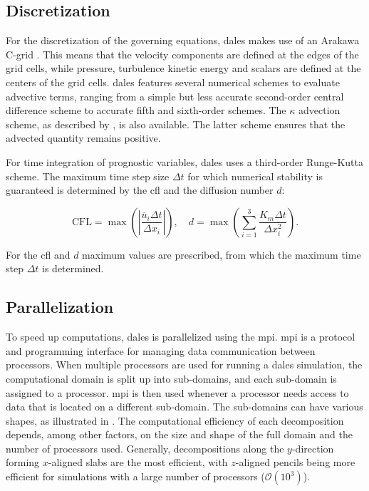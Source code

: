 \subsection{Discretization}
For the discretization of the governing equations, \acrshort{dales} makes use of an Arakawa C-grid \citep{arakawaComputationalDesignBasic1977}. This means that the velocity components are defined at the edges of the grid cells, while pressure, turbulence kinetic energy and scalars are defined at the centers of the grid cells. \acrshort{dales} features several numerical schemes to evaluate advective terms, ranging from a simple but less accurate second-order central difference scheme to accurate fifth and sixth-order schemes. The $\kappa$ advection scheme, as described by \citet{hundsdorferPositiveFiniteDifferenceAdvection1995}, is also available. The latter scheme ensures that the advected quantity remains positive.

For time integration of prognostic variables, \acrshort{dales} uses a third-order Runge-Kutta scheme. The maximum time step size $\Delta t$ for which numerical stability is guaranteed is determined by the \acrfull{cfl} and the diffusion number $d$:

\begin{equation}
    \text{CFL} = \max \left( \left| \frac{\overline{u}_i \Delta t}{\Delta x_i} \right| \right), \quad d = \max \left( \sum_{i=1}^{3} \frac{K_m \Delta t}{\Delta x_i^2} \right).
\end{equation}

For the \acrshort{cfl} and $d$ maximum values are prescribed, from which the maximum time step $\Delta t$ is determined.

\subsection{Parallelization} \label{sec:dales_mpi}
To speed up computations, \acrshort{dales} is parallelized using the \acrfull{mpi}. \acrshort{mpi} is a protocol and programming interface for managing data communication between processors. When multiple processors are used for running a \acrshort{dales} simulation, the computational domain is split up into sub-domains, and each sub-domain is assigned to a processor. \acrshort{mpi} is then used whenever a processor needs access to data that is located on a different sub-domain. The sub-domains can have various shapes, as illustrated in . The computational efficiency of each decomposition depends, among other factors, on the size and shape of the full domain and the number of processors used. Generally, decompositions along the $y$-direction forming $x$-aligned slabs are the most efficient, with $z$-aligned pencils being more efficient for simulations with a large number of processors ($\mathcal{O}(10^3)$). 


